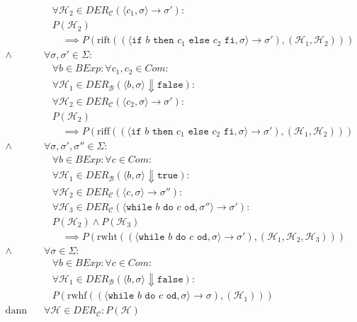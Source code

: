 \begin{align*}
						    &\quad \forall \mathcal{H} _ 2 \in \textit{DER} _ \mathcal{C} (\langle c _ 1, \sigma \rangle \rightarrow \sigma') : \\
						    &\quad P(\mathcal{H} _ 2) \\
						    &\quad\quad \implies P(\text{rift}((\langle \texttt{if } b \texttt{ then } c _ 1 \texttt{ else } c _ 2 \texttt{ fi}, \sigma \rangle \rightarrow \sigma'), (\mathcal{H} _ 1, \mathcal{H} _ 2))) \\
					    \land & \,\forall \sigma, \sigma' \in \Sigma : \\
						    &\quad \forall b \in \textit{BExp} : \forall c _ 1, c _ 2 \in \textit{Com} : \\
						    &\quad \forall \mathcal{H} _ 1 \in \textit{DER} _ \mathcal{B} (\langle b, \sigma \rangle \Downarrow \texttt{false}) : \\
						    &\quad \forall \mathcal{H} _ 2 \in \textit{DER} _ \mathcal{C} (\langle c _ 2, \sigma \rangle \rightarrow \sigma') : \\
						    &\quad P(\mathcal{H} _ 2) \\
						    &\quad\quad \implies P(\text{riff}((\langle \texttt{if } b \texttt{ then } c _ 1 \texttt{ else } c _ 2 \texttt{ fi}, \sigma \rangle \rightarrow \sigma'), (\mathcal{H} _ 1, \mathcal{H} _ 2))) \\
					    \land & \,\forall \sigma, \sigma', \sigma'' \in \Sigma : \\
						    &\quad \forall b \in \textit{BExp} : \forall c \in \textit{Com} : \\
						    &\quad \forall \mathcal{H} _ 1 \in \textit{DER} _ \mathcal{B} (\langle b, \sigma \rangle \Downarrow \texttt{true}) : \\
						    &\quad \forall \mathcal{H} _ 2 \in \textit{DER} _ \mathcal{C} (\langle c, \sigma \rangle \rightarrow \sigma'') : \\
						    &\quad \forall \mathcal{H} _ 3 \in \textit{DER} _ \mathcal{C} (\langle \texttt{while } b \texttt{ do } c \texttt{ od}, \sigma'' \rangle \rightarrow \sigma') : \\
						    &\quad P(\mathcal{H} _ 2) \land P(\mathcal{H} _ 3) \\
						    &\quad\quad \implies P(\text{rwht}((\langle \texttt{while } b \texttt{ do } c \texttt{ od}, \sigma \rangle \rightarrow \sigma'), (\mathcal{H} _ 1, \mathcal{H} _ 2, \mathcal{H} _ 3))) \\
					    \land & \,\forall \sigma \in \Sigma : \\
						    &\quad \forall b \in \textit{BExp} : \forall c \in \textit{Com} : \\
						    &\quad \forall \mathcal{H} _ 1 \in \textit{DER} _ \mathcal{B} (\langle b, \sigma \rangle \Downarrow \texttt{false}) : \\
						    &\quad P(\text{rwhf}((\langle \texttt{while } b \texttt{ do } c \texttt{ od}, \sigma \rangle \rightarrow \sigma), (\mathcal{H} _ 1))) \\
					    \text{dann gilt:} & \,\forall \mathcal{H} \in \textit{DER} _ \mathcal{C} : P(\mathcal{H}) \\
				    \end{align*}
			    
